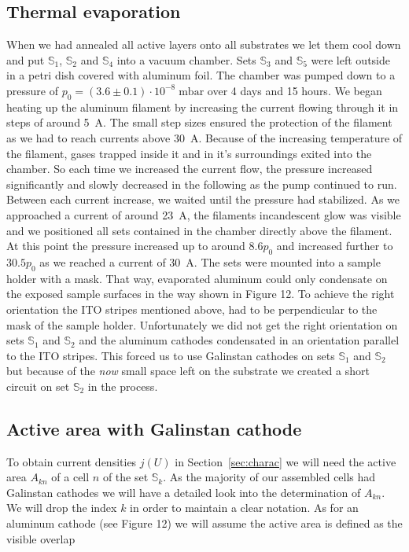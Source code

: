 \subsection{Thermal evaporation}\label{subsec:therm-eva}
When we had annealed all active layers onto all substrates we let them cool down and put $\mathbb{S}_1$, $\mathbb{S}_2$ and $\mathbb{S}_4$ into a vacuum chamber. Sets $\mathbb{S}_3$ and $\mathbb{S}_5$ were left outside in a petri dish covered with aluminum foil. The chamber was pumped down to a pressure of $p_0 = (3.6\pm 0.1)\cdot 10^{-8}\; \mathrm{mbar}$ over 4 days and 15 hours.\mypar
We began heating up the aluminum filament by increasing the current flowing through it in steps of around 5~A. The small step sizes ensured the protection of the filament as we had to reach currents above 30~A. Because of the increasing temperature of the filament, gases trapped inside it and in it's surroundings exited into the chamber. So each time we increased the current flow, the pressure increased significantly and slowly decreased in the following as the pump continued to run. Between each current increase, we waited until the pressure had stabilized. As we approached a current of around 23~A, the filaments incandescent glow was visible and we positioned all sets contained in the chamber directly above the filament. At this point the pressure increased up to around $8.6p_0$ and increased further to $30.5p_0$ as we reached a current of 30~A.\mypar
The sets were mounted into a sample holder with a mask. That way, evaporated aluminum could only condensate on the exposed sample surfaces in the way shown in \cite{labdesc} Figure 12. To achieve the right orientation the ITO stripes mentioned above, had to be perpendicular to the mask of the sample holder. Unfortunately we did not get the right orientation on sets $\mathbb{S}_1$ and $\mathbb{S}_2$ and the aluminum cathodes condensated in an orientation parallel to the ITO stripes. This forced us to use Galinstan cathodes on sets $\mathbb{S}_1$ and $\mathbb{S}_2$ but because of the \emph{now} small space left on the substrate we created a short circuit on set $\mathbb{S}_2$ in the process.

\subsection{Active area with Galinstan cathode}

To obtain current densities $j(U)$ in Section~\ref{sec:charac} we will need the active area $A_{kn}$ of a cell $n$ of the set $\mathbb{S}_k$. As the majority of our assembled cells had Galinstan cathodes we will have a detailed look into the determination of $A_{kn}$. We will drop the index $k$ in order to maintain a clear notation.\mypar
As for an aluminum cathode (see \cite{labdesc} Figure 12) we will assume the active area is defined as the visible overlap

